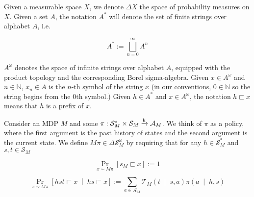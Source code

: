 \documentclass[anon,12pt]{colt2018} %
\newcommand{\Comment}[1]{}
\newcommand{\AB}[1]{\left[#1\right]}
\newcommand{\APM}[2]{\left(#1\;\middle\vert\;#2\right)}
\newcommand{\ABM}[2]{\left[#1\;\middle\vert\;#2\right]}
\newcommand{\Pa}[2]{\underset{#1}{\operatorname{Pr}}\AB{#2}}
\newcommand{\CP}[3]{\underset{#1}{\operatorname{Pr}}\ABM{#2}{#3}}
\newcommand{\Nats}{\mathbb{N}}
\newcommand{\K}{\xrightarrow{\textnormal{k}}}
\newcommand{\A}{\mathcal{A}}
\newcommand{\St}{\mathcal{S}}
\newcommand{\T}{\mathcal{T}}
\newcommand{\MP}[2]{#1#2}
\begin{document}
Given a measurable space $X$, we denote $\Delta X$ the space of probability measures on $X$. 
Given a set $A$, the notation $A^*$ will denote the set of finite strings over alphabet $A$, i.e.

\[A^* := \bigsqcup_{n = 0}^\infty A^n\]

$A^\omega$ denotes the space of infinite strings over alphabet $A$, equipped with the product topology and the corresponding Borel sigma-algebra. Given $x\in A^\omega$ and $n \in \Nats$, $x_n \in A$ is the $n$-th symbol of the string $x$ (in our conventions, $0 \in \Nats$ so the string begins from the 0th symbol.) Given $h \in A^*$ and $x \in A^\omega$, the notation $h \sqsubset x$ means that $h$ is a prefix of $x$.

\begin{samepage}
\begin{definition}

Consider an MDP $M$ and some $\pi: \St_M^* \times \St_M \K \A_M$. We think of $\pi$ as a policy, where the first argument is the past history of states and the second argument is the current state. We define $\MP{M}{\pi} \in \Delta\St_M^\omega$ by requiring that for any $h \in \St_M^*$ and $s,t \in \St_M$

\begin{equation}
\Pa{x\sim\MP{M}{\pi}}{s_M \sqsubset x} := 1
\end{equation}


\begin{equation}
\CP{x\sim\MP{M}{\pi}}{hst \sqsubset x}{hs \sqsubset x} := \sum_{a \in \A_M} {\T_M\APM{t}{s,a} \pi\APM{a}{h,s}}
\end{equation}

\Comment{In other words, $\MP{M}{\pi}$ is the probability measure over histories resulting from policy $\pi$ interacting with environment $M$.}

\end{definition}
\end{samepage}
\end{document}
